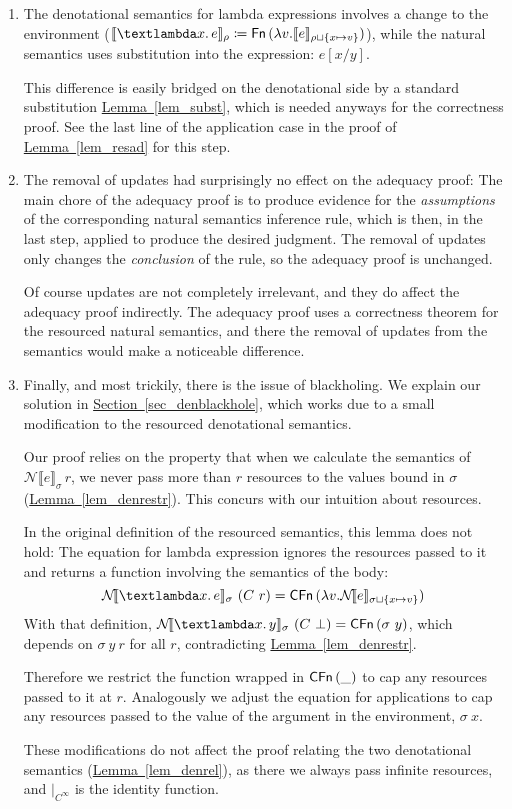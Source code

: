 \documentclass{jfp1}
\newcommand{\myref}[2]{\hyperref[#2]{#1~\ref*{#2}}}
\theoremstyle{nonumberbreak}
\newcommand{\sFn}[1]{\text{\textsf{Fn}}\,(#1)}
\newcommand{\sCFn}[1]{\text{\textsf{CFn}}\,(#1)}
\newcommand{\sLam}[2]{\text{\textlambda} #1.\, #2}
\newcommand{\dsem}[2]{\llbracket #1 \rrbracket_{#2}}
\newcommand{\dsemr}[2]{\mathcal N\!\llbracket #1 \rrbracket_{#2}}
\begin{document}
\begin{enumerate}
\item The denotational semantics for lambda expressions involves a change to the environment ($\dsem{\sLam x e}\rho \coloneqq \sFn{\lambda v. \dsem e {\rho \sqcup \{x \mapsto v\}}}$), while the natural semantics uses substitution into the expression: $e[x/y]$.

This difference is easily bridged on the denotational side by a standard substitution \myref{Lemma}{lem_subst}, which is needed anyways for the correctness proof. See the last line of the application case in the proof of \myref{Lemma}{lem_resad} for this step.

\item The removal of updates had surprisingly no effect on the adequacy proof: The main chore of the adequacy proof is to produce evidence for the \emph{assumptions} of the corresponding natural semantics inference rule, which is then, in the last step, applied to produce the desired judgment. The removal of updates only changes the \emph{conclusion} of the rule, so the adequacy proof is unchanged.

Of course updates are not completely irrelevant, and they do affect the adequacy proof indirectly. The adequacy proof uses a correctness theorem for the resourced natural semantics, and there the removal of updates from the semantics would make a noticeable difference.

\item Finally, and most trickily, there is the issue of blackholing. We explain our solution in \myref{Section}{sec_denblackhole}, which works due to a small modification to the resourced denotational semantics.

Our proof relies on the property that when we calculate the semantics of $\dsemr{e}\sigma\,r$, we never pass more than $r$ resources to the values bound in $\sigma$ (\myref{Lemma}{lem_denrestr}). This concurs with our intuition about resources.

In the original definition of the resourced semantics, this lemma does not hold: The equation for lambda expression ignores the resources passed to it and returns a function involving the semantics of the body:
\[
\dsemr{\sLam x e}\sigma ~ (C~r) = \sCFn{\lambda v. \dsemr e {\sigma \sqcup \{x \mapsto v\}}}
\]
With that definition, $\dsemr{\sLam x y}\sigma~(C~\bot) = \sCFn{\sigma~y}$, which depends on $\sigma~y~r$ for all $r$, contradicting \myref{Lemma}{lem_denrestr}.

Therefore we restrict the function wrapped in $\sCFn \_$ to cap any resources passed to it at $r$. Analogously we adjust the equation for applications to cap any resources passed to the value of the argument in the environment, $\sigma~x$.

These modifications do not affect the proof relating the two denotational semantics (\myref{Lemma}{lem_denrel}), as there we always pass infinite resources, and $|_{C^\infty}$ is the identity function.

\end{enumerate}
\end{document}
